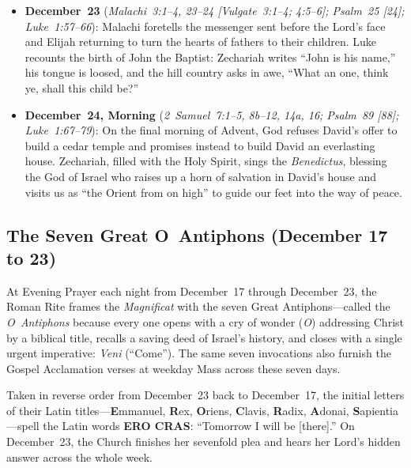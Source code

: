 \begin{itemize}
  \item \textbf{December~23} (\textit{Malachi~3:1--4, 23--24 [Vulgate~3:1--4; 4:5--6]; Psalm~25 [24]; Luke~1:57--66}): Malachi foretells the messenger sent before the Lord's face and Elijah returning to turn the hearts of fathers to their children. Luke recounts the birth of John the Baptist: Zechariah writes ``John is his name,'' his tongue is loosed, and the hill country asks in awe, ``What an one, think ye, shall this child be?''
  \item \textbf{December~24, Morning} (\textit{2~Samuel~7:1--5, 8b--12, 14a, 16; Psalm~89 [88]; Luke~1:67--79}): On the final morning of Advent, God refuses David's offer to build a cedar temple and promises instead to build David an everlasting house. Zechariah, filled with the Holy Spirit, sings the \textit{Benedictus}, blessing the God of Israel who raises up a horn of salvation in David's house and visits us as ``the Orient from on high'' to guide our feet into the way of peace.
\end{itemize}

\subsection{The Seven Great O~Antiphons (December 17 to 23)}

At Evening Prayer each night from December~17 through December~23, the Roman Rite frames the \textit{Magnificat} with the seven Great Antiphons---called the \textit{O~Antiphons} because every one opens with a cry of wonder (\textit{O}) addressing Christ by a biblical title, recalls a saving deed of Israel's history, and closes with a single urgent imperative: \textit{Veni} (``Come''). The same seven invocations also furnish the Gospel Acclamation verses at weekday Mass across these seven days.

Taken in reverse order from December~23 back to December~17, the initial letters of their Latin titles---\textbf{E}mmanuel, \textbf{R}ex, \textbf{O}riens, \textbf{C}lavis, \textbf{R}adix, \textbf{A}donai, \textbf{S}apientia---spell the Latin words \textbf{ERO CRAS}: ``Tomorrow I will be [there].'' On December~23, the Church finishes her sevenfold plea and hears her Lord's hidden answer across the whole week.

